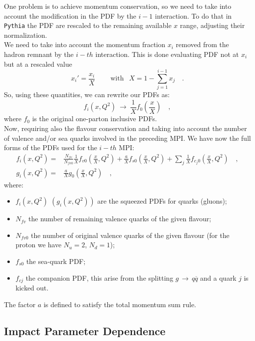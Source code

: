 One problem is to achieve momentum conservation, so we need to take into account the modification in the PDF by the $i-1$ interaction. To do that in \texttt{Pythia} the PDF are rescaled to the remaining available $x$ range, adjusting their normalization.
\\
We need to take into account the momentum fraction $x_i$ removed from the hadron remnant by the $i-th$ interaction. This is done evaluating PDF not at $x_i$ but at a rescaled value
\begin{equation}
	x_i'=\frac{x_i}{X} \qquad \ \text{with }\ \ X=1-\sum_{j=1}^{i-1}x_j\quad .
\end{equation}
So, using these quantities, we can rewrite our PDFs as:
\begin{equation}
	f_i(x,Q^2)\ \longrightarrow\ \frac{1}{X}f_0\left(\frac{x}{X}\right)\quad ,
\end{equation}
where $f_0$ is the original one-parton inclusive PDFs.
\\
Now, requiring also the flavour conservation and taking into account the number of valence and/or sea quarks involved in the preceding MPI. We have now the full forms of the PDFs used for the $i-th$ MPI:
\begin{align}
f_i(x,Q^2) =&  \frac{N_{fv}}{N_{fv0}}\frac{1}{X} f_{v0}\left( \frac{x}{X},Q^2 \right) + \frac{a}{X}f_{s0}\left( \frac{x}{X},Q^2 \right)+\displaystyle\sum_j \frac{1}{X} f_{c_j0}\left( \frac{x}{X},Q^2 \right) \quad,\\
g_i(x,Q^2) =& \frac{a}{X}g_0\left( \frac{x}{X},Q^2 \right)\quad, 
\end{align}
where: 
\begin{itemize}
	\item $f_i(x,Q^2)$ $(g_i(x,Q^2))$ are the squeezed PDFs for quarks (gluons);
	\item $N_{fv}$ the number of remaining valence quarks of the given flavour;
	\item $N_{fv0}$ the number of original valence quarks of the given flavour (for the proton we have $N_u=2$, $N_d=1$);
	\item $f_{s0}$ the sea-quark PDF;
	\item $f_{cj}$ the companion PDF, this arise from the splitting $g\,\rightarrow\,q\overline{q}$ and a quark $j$ is kicked out.
\end{itemize}
The factor $a$ is defined to satisfy the total momentum sum rule.

\subsection{Impact Parameter Dependence}

